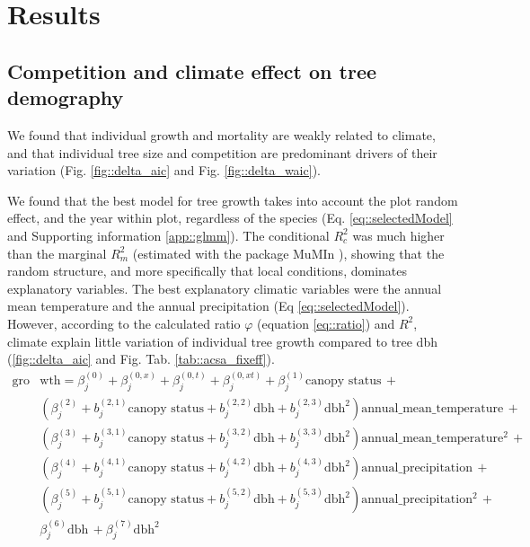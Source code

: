 \section{Results}

\subsection{Competition and climate effect on tree demography}

We found that individual growth and mortality are weakly related to climate,
and that individual tree size and competition are predominant drivers of their
variation (Fig. \ref{fig::delta_aic} and Fig. \ref{fig::delta_waic}).

We found that the best model for tree growth takes into account the plot random
effect, and the year within plot, regardless of the species (Eq.
\eqref{eq::selectedModel} and Supporting information \ref{app::glmm}). The
conditional $ R_c^2 $ was much higher than the marginal $ R_m^2 $ (estimated
with the package MuMIn \citep{MuMIn}), showing that the random structure, and
more specifically that local conditions, dominates explanatory variables.
The best explanatory climatic variables were the annual mean temperature and
the annual precipitation (Eq \ref{eq::selectedModel}). However, according to
the calculated ratio $ \varphi $ (equation \ref{eq::ratio}) and $ R^2 $, climate explain little variation
of individual tree growth compared to tree dbh (\ref{fig::delta_aic} and Fig. Tab. \ref{tab::acsa_fixeff}).
\begin{equation} \label{eq::selectedModel}
\begin{split}
	\text{gro} & \text{wth} = \beta_j^{(0)}+ \beta_{j}^{(0, x)} + \beta_{j}^{(0, t)} + \beta_{j}^{(0, xt)} + \beta_j^{(1)}  \text{canopy status} \, + \\
	& \left(\beta_j^{(2)} + b_j^{(2, 1)} \text{canopy status} + b_j^{(2, 2)} \text{dbh} + b_j^{(2, 3)} \text{dbh}^2 \right) \text{annual}\_\text{mean}\_\text{temperature} \, + \\
	& \left(\beta_j^{(3)} + b_j^{(3, 1)} \text{canopy status} + b_j^{(3, 2)} \text{dbh} + b_j^{(3, 3)} \text{dbh}^2 \right) \text{annual}\_\text{mean}\_\text{temperature}^2 \, + \\
	& \left(\beta_j^{(4)} + b_j^{(4, 1)} \text{canopy status} + b_j^{(4, 2)} \text{dbh} + b_j^{(4, 3)} \text{dbh}^2 \right) \text{annual}\_\text{precipitation} \, + \\
	& \left(\beta_j^{(5)} + b_j^{(5, 1)} \text{canopy status} + b_j^{(5, 2)} \text{dbh} + b_j^{(5, 3)} \text{dbh}^2 \right) \text{annual}\_\text{precipitation}^2 \, + \\
	& \beta_j^{(6)} \text{dbh} \, + \beta_j^{(7)} \text{dbh}^2
\end{split}
\end{equation}
